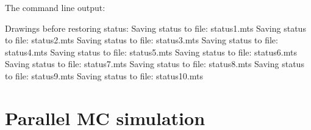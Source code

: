 \documentclass[a4paper, 12pt]{report}
\begin{document}
\begin{enumerate}
        The command line output:
        \begin{messageshell}
Drawings before restoring status:
Saving status to file: status1.mts
Saving status to file: status2.mts
Saving status to file: status3.mts
Saving status to file: status4.mts
Saving status to file: status5.mts
Saving status to file: status6.mts
Saving status to file: status7.mts
Saving status to file: status8.mts
Saving status to file: status9.mts
Saving status to file: status10.mts
        \end{messageshell}
\end{enumerate}

\chapter{Parallel MC simulation}
\end{document}
